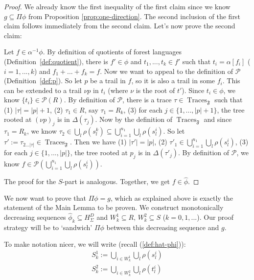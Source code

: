 \documentclass[sigplan,9pt]{acmart}\settopmatter{printfolios=true,printccs=false,printacmref=false}
\theoremstyle{definition}
\newcommand{\Ff}[0]{{\mathfrak{F}}}
\newcommand{\Pa}[0]{{\mathcal{P}}}
\newcommand{\Trace}[0]{\operatorname{Traces}}
\newcommand{\freedisth}[0]{{H_\Sigma^D}}
\begin{document}
\begin{proof}
We already know the first inequality of the first claim since we know $g \subseteq \Pi \phi$ from Proposition \ref{prop:one-direction}.
The second inclusion of the first claim follows immediately from the second claim. Let's now prove the second claim:

Let $f \in \alpha^{-1} \phi$.
By definition of quotients of forest languages (Definition~\ref{def:quotient}), there is $f' \in \phi$ and $t_1, ..., t_k \in f'$ such that $t_i = \alpha[f_i]$ ($i = 1, ..., k$) and $f_1 + ... + f_k = f$.
Now we want to appeal to the definition of $\Pa$ (Definition~\ref{def:p}).
So let $p$ be a trail in $f$, so it is also a trail in some $f_i$.
This can be extended to a trail $\nu p$ in $t_i$ (where $\nu$ is the root of $t'$).
Since $t_i \in \phi$, we know $\{t_i\} \in \Pa(R)$.
By definition of $\Pa$, there is a trace $\tau \in \Trace_\Ff$ such that (1) $|\tau| = |p|+1$, (2) $\tau_1 \in R$, say $\tau_1 = R_k$, (3) for each $j \in \{1, ..., |p|+1\}$, the tree rooted at $(\nu p)_j$ is in $\Delta(\tau_j)$.
Now by the definition of $\Trace_\Ff$ and since $\tau_1 = R_k$, we know $\tau_2 \in \bigcup_l \rho(s^k_l) \subseteq \bigcup_{i=1}^{n_1} \bigcup_l \rho(s^i_l)$.
So let $\tau' := \tau_{2...|\tau|} \in \Trace_\Ff$. Then we have (1) $|\tau'| = |p|$, (2) $\tau'_1 \in \bigcup_{i=1}^{n_1} \bigcup_l \rho(s^i_l)$, (3) for each $j \in \{1, ..., |p|\}$, the tree rooted at $p_j$ is in $\Delta(\tau'_j)$.
By definition of $\Pa$, we know $f \in \Pa\left(\bigcup_{i=1}^{n_1} \bigcup_l \rho(s^i_l)\right)$.

The proof for the $S$-part is analogous. Together, we get $f \in \widehat{\phi}$.
\end{proof}




We now want to prove that $\Pi \phi = g$, which as explained above is exactly the statement of the Main Lemma to be proven.
We construct monotonically decreasing sequences $\widehat{\phi}_k \subseteq \freedisth$ and $W^1_k \subseteq R$, $W^2_k \subseteq S$ ($k = 0, 1, ...$).
Our proof strategy will be to `sandwich' $\Pi\phi$ between this decreasing sequence and $g$.


To make notation nicer, we will write (recall (\ref{def:hat-phi})):
\begin{align*}
S_k^1 := \bigcup_{i \in W^1_k} \bigcup_l \rho(s^i_l) \\
S_k^2 := \bigcup_{i \in W^2_k} \bigcup_l \rho(t^i_l)
\end{align*}
\end{document}
